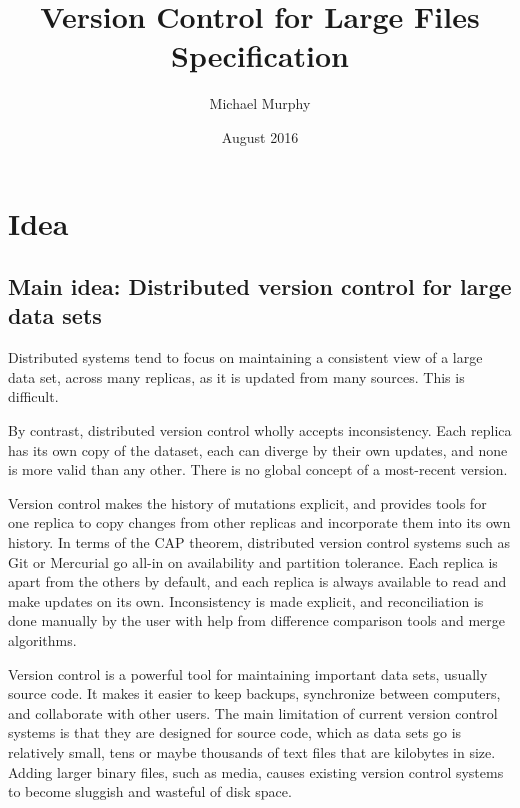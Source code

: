 \documentclass[a4paper]{article}
\begin{document}
\title{Version Control for Large Files\\
    Specification}
\author{Michael Murphy}
\date{August 2016}
\maketitle

\section{Idea}\label{idea}

\subsection{Main idea: Distributed version control for large data
sets}\label{main-idea-distributed-version-control-for-large-data-sets}

Distributed systems tend to focus on maintaining a consistent view of a large
data set, across many replicas, as it is updated from many sources.
This is difficult.

By contrast, distributed version control wholly accepts inconsistency.
Each replica has its own copy of the dataset, each can diverge by their own
updates, and none is more valid than any other.
There is no global concept of a most-recent version.

Version control makes the history of mutations explicit, and provides tools for
one replica to copy changes from other replicas and incorporate them into its
own history.
In terms of the CAP theorem, distributed version control systems such as Git or
Mercurial go all-in on availability and partition tolerance.
Each replica is apart from the others by default, and each replica is always
available to read and make updates on its own.
Inconsistency is made explicit, and reconciliation is done manually by the user
with help from difference comparison tools and merge algorithms.

Version control is a powerful tool for maintaining important data sets, usually
source code.
It makes it easier to keep backups, synchronize between computers, and
collaborate with other users.
The main limitation of current version control systems is that they are designed
for source code, which as data sets go is relatively small, tens or maybe
thousands of text files that are kilobytes in size.
Adding larger binary files, such as media, causes existing version control
systems to become sluggish and wasteful of disk space.
\end{document}
